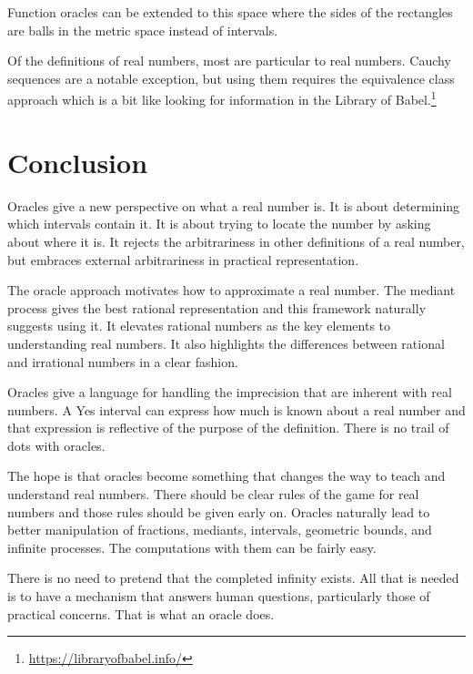 \documentclass[12pt]{article}
\theoremstyle{remark}
\begin{document}
Function oracles can be extended to this space where the sides of the rectangles are balls in the metric space instead of intervals. 

Of the definitions of real numbers, most are particular to real numbers. Cauchy sequences are a notable exception, but using them requires the equivalence class approach which is a bit like looking for information in the Library of Babel.\footnote{\url{https://libraryofbabel.info/}} 

\section{Conclusion}

Oracles give a new perspective on what a real number is. It is about determining which intervals contain it. It is about trying to locate the number by asking about where it is. It rejects the arbitrariness in other definitions of a real number, but embraces external arbitrariness in practical representation.

The oracle approach motivates how to approximate a real number. The mediant process gives the best rational representation and this framework naturally suggests using it. It elevates rational numbers as the key elements to understanding real numbers. It also highlights the differences between rational and irrational numbers in a clear fashion. 

Oracles give a language for handling the imprecision that are inherent with real numbers. A Yes interval can express how much is known about a real number and that expression is reflective of the purpose of the definition. There is no  trail of dots with oracles. 

The hope is that oracles become something that changes the way to teach and understand real numbers. There should be clear rules of the game for real numbers and those rules should be given early on. Oracles naturally lead to better manipulation of fractions, mediants, intervals, geometric bounds, and infinite processes. The computations with them can be fairly easy. 

There is no need to pretend that the completed infinity exists. All that is needed is to have a mechanism that answers human questions, particularly those of practical concerns. That is what an oracle does. 

\medskip

\printbibliography
\end{document}
